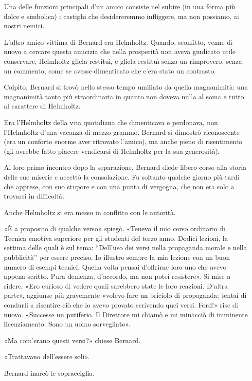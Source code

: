\documentclass[
a5paper, %
10pt, %
twoside, 
onecolumn, %
openany, %
]{memoir}
\begin{document}
Una delle funzioni principali d’un amico consiste nel subire (in una forma più dolce e simbolica) i castighi che desidereremmo infliggere, ma non possiamo, ai nostri nemici.

L’altro amico vittima di Bernard era Helmholtz. Quando, sconfitto, venne di nuovo a cercare questa amicizia che nella prosperità non aveva giudicato utile conservare, Helmholtz gliela restituì, e gliela restituì senza un rimprovero, senza un commento, come se avesse dimenticato che c’era stato un contrasto.

Colpito, Bernard si trovò nello stesso tempo umiliato da quella magnanimità: una magnanimità tanto più straordinaria in quanto non doveva nulla al soma e tutto al carattere di Helmholtz.

Era l’Helmholtz della vita quotidiana che dimenticava e perdonava, non l’Helmholtz d’una vacanza di mezzo grammo. Bernard si dimostrò riconoscente (era un conforto enorme aver ritrovato l’amico), ma anche pieno di risentimento (gli avrebbe fatto piacere vendicarsi di Helmholtz per la sua generosità).

Al loro primo incontro dopo la separazione, Bernard diede libero corso alla storia delle sue miserie e accettò la consolazione. Fu soltanto qualche giorno più tardi che apprese, con suo stupore e con una punta di vergogna, che non era solo a trovarsi in difficoltà.

Anche Helmholtz si era messo in conflitto con le autorità.

«È a proposito di qualche verso» spiegò. «Tenevo il mio corso ordinario di Tecnica emotiva superiore per gli studenti del terzo anno. Dodici lezioni, la settima delle quali è sul tema: “Dell’uso dei versi nella propaganda morale e nella pubblicità” per essere preciso. Io illustro sempre la mia lezione con un buon numero di esempi tecnici. Quella volta pensai d’offrirne loro uno che avevo appena scritto. Pura demenza, d’accordo, ma non potei resistere». Si mise a ridere. «Ero curioso di vedere quali sarebbero state le loro reazioni. D’altra parte», aggiunse più gravemente «volevo fare un briciolo di propaganda; tentai di condurli a risentire ciò che io avevo provato scrivendo quei versi. Ford!» rise di nuovo. «Successe un putiferio. Il Direttore mi chiamò e mi minacciò di imminente licenziamento. Sono un uomo sorvegliato».

«Ma com’erano questi versi?» chiese Bernard.

«Trattavano dell’essere soli».

Bernard inarcò le sopracciglia.
\end{document}
